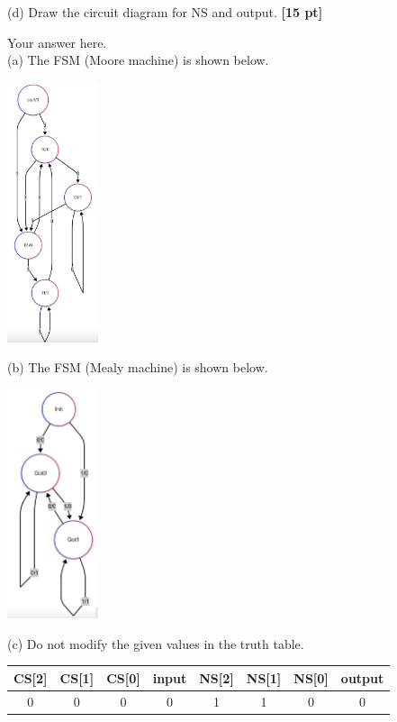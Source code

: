 \documentclass[a4paper]{article}
\begin{document}
(d) Draw the circuit diagram for NS and output. \textbf{[15 pt]}
\begin{answer}[Question 3]
    Your answer here.\\
    (a) The FSM (Moore machine) is shown below.\\
        \begin{center}
            \includegraphics[width=0.2\textwidth]{FSM.png}
        \end{center}
    (b) The FSM (Mealy machine) is shown below.\\
        \begin{center}
            \includegraphics[width=0.2\textwidth]{FSM2.png}
        \end{center}
    (c) Do not modify the given values in the truth table.\\
    \begin{center}
        \begin{tabular}{ |c|c|c|c||c|c|c|c| } 
            \hline
            CS[2] & CS[1] & CS[0] & input & NS[2] & NS[1] & NS[0] & output \\ 
            \hline
            0 & 0 & 0 & 0 & 1 & 1 & 0 & 0 \\ 

\end{tabular}
\end{center}
\end{answer}
\end{document}

